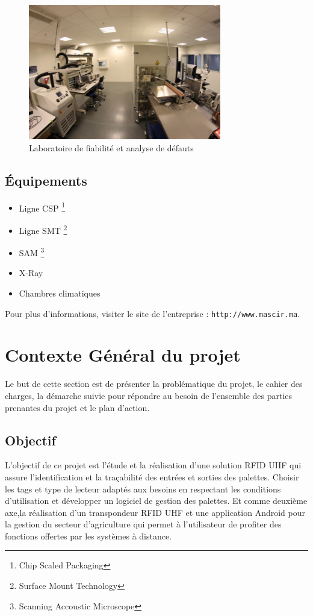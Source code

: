 \documentclass[11pt, a4paper, twoside]{book}
\begin{document}
\begin{figure}[H]
\centering
\includegraphics[width=0.75\textwidth]{labo}
\caption{Laboratoire de fiabilité et analyse de défauts}
\end{figure}

\subsection{Équipements}
\begin{itemize}
\item Ligne CSP \footnote{Chip Scaled Packaging}
\item Ligne SMT \footnote{Surface Mount Technology}
\item SAM \footnote{Scanning Accoustic Microscope}
\item X-Ray
\item Chambres climatiques
\end{itemize}

Pour plus d'informations, visiter le site de l'entreprise : \texttt{http://www.mascir.ma}.


\section{Contexte Général du projet}
Le but de cette section est de présenter la problématique du projet, le cahier des charges, la démarche suivie pour répondre au besoin de l’ensemble des parties prenantes du projet et le plan d’action.

\subsection{Objectif}
L’objectif de ce projet est l'étude et la réalisation d’une solution RFID UHF qui assure l’identification et la traçabilité des entrées et sorties des palettes. Choisir les tags et type de lecteur adaptés aux besoins en respectant les conditions d’utilisation et  développer un logiciel de gestion des palettes. 
Et comme deuxième axe,la réalisation d’un transpondeur RFID UHF et une application Android pour la gestion du secteur d'agriculture qui permet à
l’utilisateur de profiter des fonctions offertes par les systèmes à distance. \\
\end{document}
